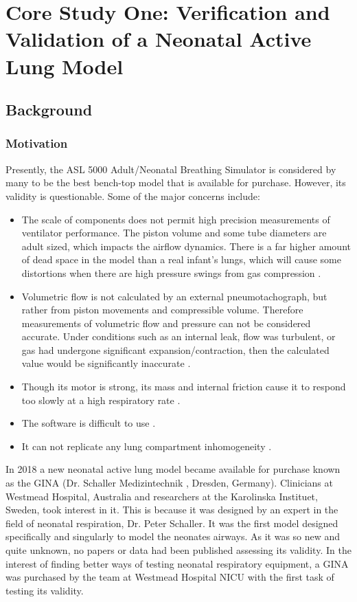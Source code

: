 \documentclass[12pt, openany, oneside]{book}
\begin{document}
\chapter{Core Study One: Verification and Validation of a Neonatal Active Lung Model}

\section{Background}
\subsection{Motivation}
Presently, the ASL 5000 Adult/Neonatal Breathing Simulator is considered by many to be the best bench-top model that is available for purchase. However, its validity is questionable. Some of the major concerns include:

\begin{itemize}
\item{The scale of components does not permit high precision measurements of ventilator performance. The piston volume and some tube diameters are adult sized, which impacts the airflow dynamics. There is a far higher amount of dead space in the model than a real infant's lungs, which will cause some distortions when there are high pressure swings from gas compression \citep{thomas}.}
\item{Volumetric flow is not calculated by an external pneumotachograph, but rather from piston movements and compressible volume. Therefore measurements of volumetric flow and pressure can not be considered accurate. Under conditions such as an internal leak, flow was turbulent, or gas had undergone significant expansion/contraction, then the calculated value would be significantly inaccurate \citep{thomas}.}
\item{Though its motor is strong, its mass and internal friction cause it to respond too slowly at a high respiratory rate \citep{thomas}.}
\item{The software is difficult to use \citep{thomas}.}
\item{It can not replicate any lung compartment inhomogeneity \citep{stank2017}.}
\end{itemize}

In 2018 a new neonatal active lung model became available for purchase known as the GINA (Dr. Schaller Medizintechnik \texttrademark, Dresden, Germany). Clinicians at Westmead Hospital, Australia and researchers at the Karolinska Instituet, Sweden, took interest in it. This is because it was designed by an expert in the field of neonatal respiration, Dr. Peter Schaller. It was the first model designed specifically and singularly to model the neonates airways. As it was so new and quite unknown, no papers or data had been published assessing its validity. In the interest of finding better ways of testing neonatal respiratory equipment, a GINA was purchased by the team at Westmead Hospital NICU with the first task of testing its validity.
\end{document}
